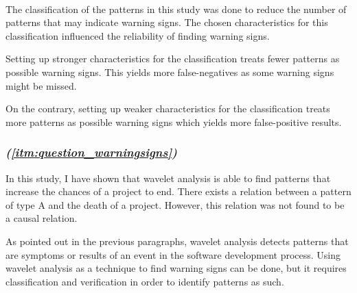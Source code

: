 \paragraph{}
The classification of the patterns in this study was done to reduce the
number of patterns that may indicate warning signs. The chosen characteristics
for this classification influenced the reliability of finding warning signs.

Setting up stronger characteristics for the classification treats fewer
patterns as possible warning signs. This yields more false-negatives as some
warning signs might be missed.

On the contrary, setting up weaker characteristics for the classification treats
more patterns as possible warning signs which yields more false-positive
results.

\subsubsection{\textit{\researchQuestion (\ref{itm:question_warningsigns})}}
In this study, I have shown that wavelet analysis is able to find patterns that
increase the chances of a project to end. There exists a relation between a
pattern of type A and the death of a project. However, this relation was not
found to be a causal relation.

As pointed out in the previous paragraphs, wavelet analysis detects patterns
that are symptoms or results of an event in the software development process.
Using wavelet analysis as a technique to find warning signs can be done, but it
requires classification and verification in order to identify patterns as
such.

